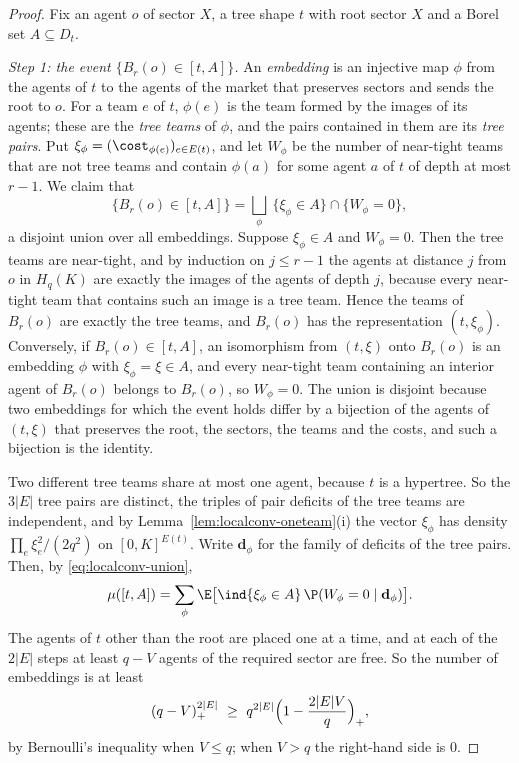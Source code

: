 \begin{proof}
Fix an agent $o$ of sector $X$, a tree shape $t$ with root sector $X$ and a Borel set
$A\subseteq D_t$.

\emph{Step 1: the event $\{B_r(o)\in[t,A]\}$.} An \emph{embedding} is an injective map
$\phi$ from the agents of $t$ to the agents of the market that preserves sectors and sends
the root to $o$. For a team $e$ of $t$, $\phi(e)$ is the team formed by the images of its
agents; these are the \emph{tree teams} of $\phi$, and the pairs contained in them are its
\emph{tree pairs}. Put $\xi_\phi=(\cost_{\phi(e)})_{e\in E(t)}$, and let $W_\phi$ be the number
of near-tight teams that are not tree teams and contain $\phi(a)$ for some agent $a$ of $t$
of depth at most $r-1$. We claim that
\begin{equation}\label{eq:localconv-union}
\{B_r(o)\in[t,A]\}=\bigsqcup_{\phi}\ \{\xi_\phi\in A\}\cap\{W_\phi=0\},
\end{equation}
a disjoint union over all embeddings. Suppose $\xi_\phi\in A$ and $W_\phi=0$. Then the tree
teams are near-tight, and by induction on $j\le r-1$ the agents at distance $j$ from $o$ in
$H_q(K)$ are exactly the images of the agents of depth $j$, because every near-tight team
that contains such an image is a tree team. Hence the teams of $B_r(o)$ are exactly the tree
teams, and $B_r(o)$ has the representation $(t,\xi_\phi)$. Conversely, if $B_r(o)\in[t,A]$,
an isomorphism from $(t,\xi)$ onto $B_r(o)$ is an embedding $\phi$ with $\xi_\phi=\xi\in A$,
and every near-tight team containing an interior agent of $B_r(o)$ belongs to $B_r(o)$, so
$W_\phi=0$. The union is disjoint because two embeddings for which the event holds differ by
a bijection of the agents of $(t,\xi)$ that preserves the root, the sectors, the teams and
the costs, and such a bijection is the identity.

Two different tree teams share at most one agent, because $t$ is a hypertree. So the $3|E|$
tree pairs are distinct, the triples of pair deficits of the tree teams are independent, and
by Lemma~\ref{lem:localconv-oneteam}(i) the vector $\xi_\phi$ has density
$\prod_e\xi_e^2/(2q^2)$ on $[0,K]^{E(t)}$. Write $\mathbf d_\phi$ for the family of deficits
of the tree pairs. Then, by \eqref{eq:localconv-union},
\begin{equation}\label{eq:localconv-mass}
\mu([t,A])=\sum_\phi\E\bigl[\ind\{\xi_\phi\in A\}\,\P(W_\phi=0\mid\mathbf d_\phi)\bigr].
\end{equation}
The agents of $t$ other than the root are placed one at a time, and at each of the $2|E|$
steps at least $q-V$ agents of the required sector are free. So the number of embeddings is
at least
\begin{equation}\label{eq:localconv-count}
(q-V)_+^{2|E|}\ \ge\ q^{2|E|}\Bigl(1-\frac{2|E|V}{q}\Bigr)_+ ,
\end{equation}
by Bernoulli's inequality when $V\le q$; when $V>q$ the right-hand side is $0$.


\end{proof}
